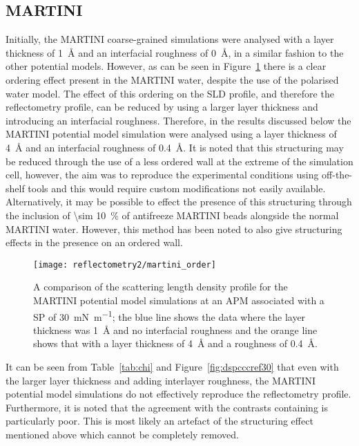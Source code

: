 \subsection{MARTINI}
\label{sec:martanal}
Initially, the MARTINI coarse-grained simulations were analysed with a layer thickness of \SI{1}{\angstrom} and an interfacial roughness of \SI{0}{\angstrom}, in a similar fashion to the other potential models.
However, as can be seen in Figure~\ref{fig:martorder} there is a clear ordering effect present in the MARTINI water, despite the use of the polarised water model.
The effect of this ordering on the SLD profile, and therefore the reflectometry profile, can be reduced by using a larger layer thickness and introducing an interfacial roughness.
Therefore, in the results discussed below the MARTINI potential model simulation were analysed using a layer thickness of \SI{4}{\angstrom} and an interfacial roughness of \SI{0.4}{\angstrom}.
It is noted that this structuring may be reduced through the use of a less ordered wall\autocite{koutsioubas_combined_2016} at the extreme of the simulation cell, however, the aim was to reproduce the experimental conditions using off-the-shelf tools and this would require custom modifications not easily available.
Alternatively, it may be possible to effect the presence of this structuring through the inclusion of \SI{\sim 10}{\percent} of antifreeze MARTINI beads alongside the normal MARTINI water.
However, this method has been noted to also give structuring effects in the presence on an ordered wall.\autocite{marrink_comment_2010}
%
\begin{figure}[b]
    \centering
    \texttt{[image: reflectometry2/martini\_order]}
    \caption{A comparison of the scattering length density profile for the MARTINI potential model simulations at an APM associated with a SP of \SI{30}{\milli\newton\per\meter}; the blue line shows the data where the layer thickness was \SI{1}{\angstrom} and no interfacial roughness and the orange line shows that with a layer thickness of \SI{4}{\angstrom} and a roughness of \SI{0.4}{\angstrom}.}
    \label{fig:martorder}
\end{figure}
%

It can be seen from Table~\ref{tab:chi} and Figure~\ref{fig:dspcccref30} that even with the larger layer thickness and adding interlayer roughness, the MARTINI potential model simulations do not effectively reproduce the reflectometry profile.
Furthermore, it is noted that the agreement with the contrasts containing  is particularly poor.
This is most likely an artefact of the structuring effect mentioned above which cannot be completely removed.

